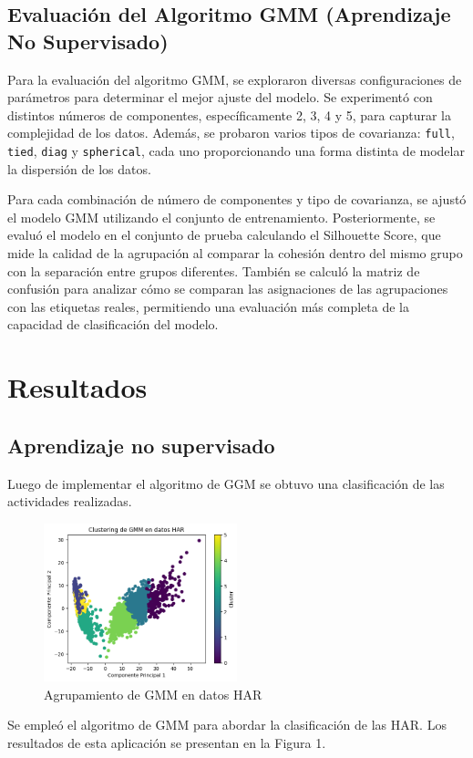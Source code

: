 \documentclass{esannV2}
\begin{document}
\subsection{Evaluación del Algoritmo GMM (Aprendizaje No Supervisado)}
Para la evaluación del algoritmo GMM, se exploraron diversas configuraciones de parámetros para determinar el mejor ajuste del modelo. Se experimentó con distintos números de componentes, específicamente 2, 3, 4 y 5, para capturar la complejidad de los datos. Además, se probaron varios tipos de covarianza: \texttt{full}, \texttt{tied}, \texttt{diag} y \texttt{spherical}, cada uno proporcionando una forma distinta de modelar la dispersión de los datos.

Para cada combinación de número de componentes y tipo de covarianza, se ajustó el modelo GMM utilizando el conjunto de entrenamiento. Posteriormente, se evaluó el modelo en el conjunto de prueba calculando el Silhouette Score, que mide la calidad de la agrupación al comparar la cohesión dentro del mismo grupo con la separación entre grupos diferentes. También se calculó la matriz de confusión para analizar cómo se comparan las asignaciones de las agrupaciones con las etiquetas reales, permitiendo una evaluación más completa de la capacidad de clasificación del modelo.




\section{Resultados}
\subsection{Aprendizaje no supervisado}
Luego de implementar el algoritmo de GGM se obtuvo una clasificación de las actividades realizadas.
\begin{figure}[ht!]
\centering
\includegraphics[width=0.5\textwidth]{figs/Resultados.png}
\caption{Agrupamiento de GMM en datos HAR}\label{Fig:resultados}
\end{figure}
Se empleó el algoritmo de GMM para abordar la clasificación de las HAR. Los resultados de esta aplicación se presentan en la Figura 1.
\end{document}
